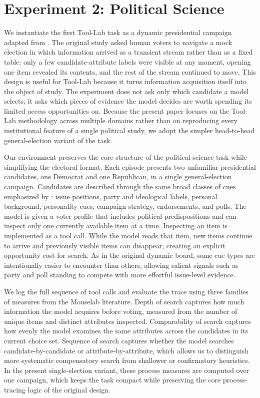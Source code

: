 \section{Experiment 2: Political Science}
We instantiate the first Tool-Lab task as a dynamic presidential campaign adapted from
\citet{lau2006voters}. The original study asked human voters to navigate a mock election
in which information arrived as a transient stream rather than as a fixed table: only a
few candidate-attribute labels were visible at any moment, opening one item revealed its
contents, and the rest of the stream continued to move. This design is useful for
Tool-Lab because it turns information acquisition itself into the object of study. The
experiment does not ask only which candidate a model selects; it asks which pieces of
evidence the model decides are worth spending its limited access opportunities on. Because
the present paper focuses on the Tool-Lab methodology across multiple domains rather than
on reproducing every institutional feature of a single political study, we adopt the
simpler head-to-head general-election variant of the task.

Our environment preserves the core structure of the political-science task while
simplifying the electoral format. Each episode presents two unfamiliar presidential
candidates, one Democrat and one Republican, in a single general-election campaign.
Candidates are described through the same broad classes of cues emphasized by
\citet{lau2006voters}: issue positions, party and ideological labels, personal
background, personality cues, campaign strategy, endorsements, and polls. The model is
given a voter profile that includes political predispositions and can inspect only one
currently available item at a time.
Inspecting an item is implemented as a tool call. While the model reads that item, new
items continue to arrive and previously visible items can disappear, creating an explicit
opportunity cost for search. As in the original dynamic board, some cue types are
intentionally easier to encounter than others, allowing salient signals such as party and
poll standing to compete with more effortful issue-level evidence.

We log the full sequence of tool calls and evaluate the trace using three families of
measures from the Mouselab literature. Depth of search captures how much information the
model acquires before voting, measured from the number of unique items and distinct
attributes inspected. Comparability of search captures how evenly the model examines the
same attributes across the candidates in its current choice set. Sequence of search
captures whether the model searches candidate-by-candidate or attribute-by-attribute,
which allows us to distinguish more systematic compensatory search from shallower or
confirmatory heuristics. In the present single-election variant, these process measures
are computed over one campaign, which keeps the task compact while preserving the core
process-tracing logic of the original design.

